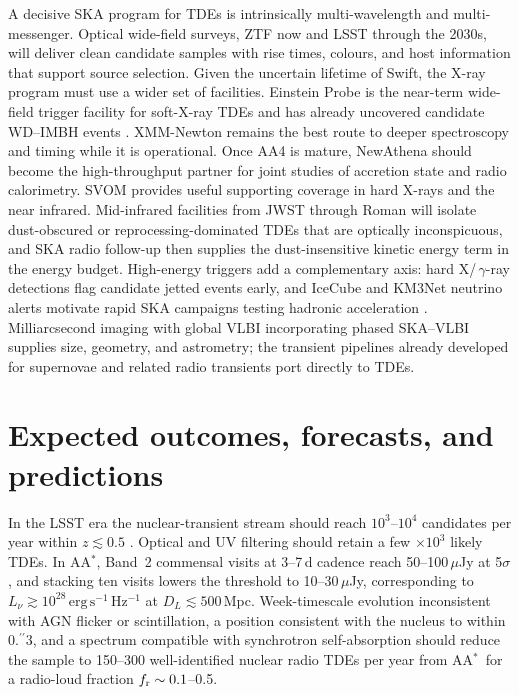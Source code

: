 \documentclass[a4paper,11pt]{article}
\providecommand{\farcs}{.\!\!^{\prime\prime}}
\newcommand{\AAstar}{AA$^{\ast}$}
\begin{document}
A decisive SKA program for TDEs is intrinsically multi-wavelength and multi-messenger. Optical wide-field surveys, ZTF now and LSST through the 2030s, will deliver clean candidate samples with rise times, colours, and host information that support source selection. Given the uncertain lifetime of Swift, the X-ray program must use a wider set of facilities. Einstein Probe is the near-term wide-field trigger facility for soft-X-ray TDEs and has already uncovered candidate WD--IMBH events \citep{OConnor2025,Li2025}. XMM-Newton remains the best route to deeper spectroscopy and timing while it is operational. Once AA4 is mature, NewAthena should become the high-throughput partner for joint studies of accretion state and radio calorimetry. SVOM provides useful supporting coverage in hard X-rays and the near infrared. Mid-infrared facilities from JWST through Roman will isolate dust-obscured or reprocessing-dominated TDEs that are optically inconspicuous, and SKA radio follow-up then supplies the dust-insensitive kinetic energy term in the energy budget. High-energy triggers add a complementary axis: hard X/\,$\gamma$-ray detections flag candidate jetted events early, and IceCube and KM3Net neutrino alerts motivate rapid SKA campaigns testing hadronic acceleration \citep{Murase2020, Stein2021, Reusch2022}. Milliarcsecond imaging with global VLBI \cite[EVN/VLBA/LBA and African VLBI Network;][]{Bempong-Manful.1.2026.SKA} incorporating phased SKA--VLBI supplies size, geometry, and astrometry; the transient pipelines already developed for supernovae and related radio transients port directly to TDEs.


\section{Expected outcomes, forecasts, and predictions}

In the LSST era the nuclear-transient stream should reach $10^{3}$--$10^{4}$ candidates per year within $z\lesssim 0.5$ \citep{Ivezic2019,vanVelzen2021}. Optical and UV filtering should retain a few $\times 10^{3}$ likely TDEs. In \AAstar, Band~2 commensal visits at 3--7\,d cadence reach 50--100\,$\mu$Jy at 5$\sigma$, and stacking ten visits lowers the threshold to 10--30\,$\mu$Jy, corresponding to $L_{\nu}\gtrsim 10^{28}\,\mathrm{erg\,s^{-1}\,Hz^{-1}}$ at $D_{L}\lesssim 500$\,Mpc. Week-timescale evolution inconsistent with AGN flicker or scintillation, a position consistent with the nucleus to within $0\farcs3$, and a spectrum compatible with synchrotron self-absorption should reduce the sample to 150--300 well-identified nuclear radio TDEs per year from \AAstar\ for a radio-loud fraction $f_{\rm r}\sim 0.1$--0.5.
\end{document}
